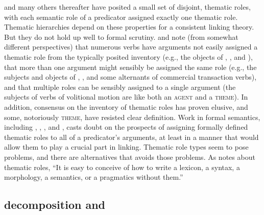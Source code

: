 \documentclass[output=paper]{langsci/langscibook}
\begin{document}
\citet{Fillmore1968} and many others thereafter have posited a small set of disjoint, thematic roles, with each semantic role of a predicator assigned exactly one thematic role.
Thematic hierarchies depend on these properties for a consistent linking theory.
But they do not hold up well to formal scrutiny.
\citet{Jackendoff1987} and \citet{Dowty1991} note (from somewhat different perspectives) that numerous verbs have arguments not easily assigned a thematic role from the typically posited inventory (e.g., the objects of , , and ), that more than one argument might sensibly be assigned the same role (e.g., the subjects and objects of , , and some alternants of commercial transaction verbs), and that multiple roles can be sensibly assigned to a single argument (the subjects of verbs of volitional motion are like both an \textsc{agent} and a \textsc{theme}).
In addition, consensus on the inventory of thematic roles has proven elusive, and some, notoriously \textsc{theme}, have resisted clear definition.
Work in formal semantics, including \citet{LadusawandDowty1988}, \citet{Dowty1989}, \citet{Landman2000}, and \cite{Schein2002}, casts doubt on the prospects of assigning formally defined thematic roles to all of a predicator's arguments, at least in a manner that would allow them to play a crucial part in linking.
Thematic role types seem to pose problems, and there are alternatives that avoids those problems.  As \citet{Carlson1998} notes about thematic roles, ``It is easy to conceive of how to write a lexicon, a syntax, a morphology, a semantics, or a pragmatics without them.''

%

\subsection{\content decomposition and \argst}
\end{document}
